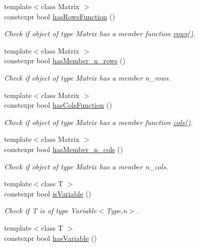 \begin{DoxyCompactItemize}
{\footnotesize template$<$class Matrix $>$ }\\constexpr bool \hyperlink{namespaceFunG_1_1Checks_a45a54dc6fc2c1d24a88be78a79a5a72c}{has\+Rows\+Function} ()
\begin{DoxyCompactList}\small\item\em Check if object of type Matrix has a member function \hyperlink{namespaceFunG_1_1LinearAlgebra_abd3afa2fcd2194787342b2662cfa9f5a}{rows()}. \end{DoxyCompactList}\item 
{\footnotesize template$<$class Matrix $>$ }\\constexpr bool \hyperlink{namespaceFunG_1_1Checks_ae4d420ada8ff4b411cd351645325125e}{has\+Member\+\_\+n\+\_\+rows} ()
\begin{DoxyCompactList}\small\item\em Check if object of type Matrix has a member n\+\_\+rows. \end{DoxyCompactList}\item 
{\footnotesize template$<$class Matrix $>$ }\\constexpr bool \hyperlink{namespaceFunG_1_1Checks_a3da195bf2a00ee02d12b19857723cb34}{has\+Cols\+Function} ()
\begin{DoxyCompactList}\small\item\em Check if object of type Matrix has a member function \hyperlink{namespaceFunG_1_1LinearAlgebra_ae981b8bee32eea3ce87f41874835c9c1}{cols()}. \end{DoxyCompactList}\item 
{\footnotesize template$<$class Matrix $>$ }\\constexpr bool \hyperlink{namespaceFunG_1_1Checks_aa93bc7629b88570df808e580ab436d8c}{has\+Member\+\_\+n\+\_\+cols} ()
\begin{DoxyCompactList}\small\item\em Check if object of type Matrix has a member n\+\_\+cols. \end{DoxyCompactList}\item 
{\footnotesize template$<$class T $>$ }\\constexpr bool \hyperlink{namespaceFunG_1_1Checks_ac2a1a8aedf54c42cb6d47b3b64bbc761}{is\+Variable} ()
\begin{DoxyCompactList}\small\item\em Check if T is of type Variable$<$\+Type,n$>$. \end{DoxyCompactList}\item 
{\footnotesize template$<$class T $>$ }\\constexpr bool \hyperlink{namespaceFunG_1_1Checks_a6d289274975a662346a1b5adf0d31f37}{has\+Variable} ()

\end{DoxyCompactItemize}
